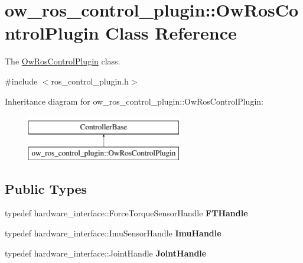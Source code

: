 \hypertarget{classow__ros__control__plugin_1_1OwRosControlPlugin}{}\section{ow\+\_\+ros\+\_\+control\+\_\+plugin\+:\+:Ow\+Ros\+Control\+Plugin Class Reference}
\label{classow__ros__control__plugin_1_1OwRosControlPlugin}


The \hyperlink{classow__ros__control__plugin_1_1OwRosControlPlugin}{Ow\+Ros\+Control\+Plugin} class.  




{\ttfamily \#include $<$ros\+\_\+control\+\_\+plugin.\+h$>$}

Inheritance diagram for ow\+\_\+ros\+\_\+control\+\_\+plugin\+:\+:Ow\+Ros\+Control\+Plugin\+:\begin{figure}[H]
\begin{center}
\leavevmode
\includegraphics[height=2.000000cm]{dd/d2a/classow__ros__control__plugin_1_1OwRosControlPlugin}
\end{center}
\end{figure}
\subsection*{Public Types}
\begin{DoxyCompactItemize}
\item 
typedef hardware\+\_\+interface\+::\+Force\+Torque\+Sensor\+Handle {\bfseries F\+T\+Handle}\hypertarget{classow__ros__control__plugin_1_1OwRosControlPlugin_a19b92de391a81df3a2b8966417c857b7}{}\label{classow__ros__control__plugin_1_1OwRosControlPlugin_a19b92de391a81df3a2b8966417c857b7}

\item 
typedef hardware\+\_\+interface\+::\+Imu\+Sensor\+Handle {\bfseries Imu\+Handle}\hypertarget{classow__ros__control__plugin_1_1OwRosControlPlugin_a85303238493b43bd5f56ca70e49667a6}{}\label{classow__ros__control__plugin_1_1OwRosControlPlugin_a85303238493b43bd5f56ca70e49667a6}

\item 
typedef hardware\+\_\+interface\+::\+Joint\+Handle {\bfseries Joint\+Handle}\hypertarget{classow__ros__control__plugin_1_1OwRosControlPlugin_afdb8cfc0ead65ad00622559e85135f10}{}\label{classow__ros__control__plugin_1_1OwRosControlPlugin_afdb8cfc0ead65ad00622559e85135f10}

\end{DoxyCompactItemize}
